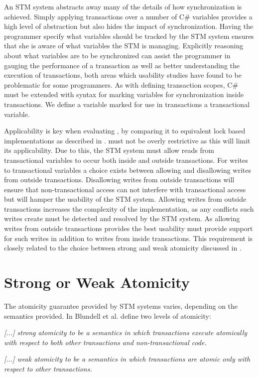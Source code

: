 An \ac{STM} system abstracts away many of the details of how synchronization is achieved. Simply applying transactions over a number of C\# variables provides a high level of abstraction but also hides the impact of synchronization. Having the programmer specify what variables should be tracked by the \ac{STM} system ensures that she is aware of what variables the \ac{STM} is managing. Explicitly reasoning about what variables are to be synchronized can assist the programmer in gauging the performance of a transaction as well as better understanding the execution of transactions, both areas which usability studies\cite{rossbach2010transactional}\cite{pankratius2009does} have found to be problematic for some programmers. As with defining transaction scopes, C\# must be extended with syntax for marking variables for synchronization inside transactions. We define a variable marked for use in transactions a transactional variable.

Applicability is key when evaluating \stmnamesp, by comparing it to equivalent lock based implementations as described in . \stmnamesp must not be overly restrictive as this will limit its applicability. Due to this, the \ac{STM} system must allow reads from transactional variables to occur both inside and outside transactions. For writes to transactional variables a choice exists between allowing and disallowing writes from outside transactions. Disallowing writes from outside transactions will ensure that non-transactional access can not interfere with transactional access but will hamper the usability of the \ac{STM} system. Allowing writes from outside transactions increases the complexity of the implementation, as any conflicts such writes create must be detected and resolved by the \ac{STM} system. As allowing writes from outside transactions provides the best usability \stmnamesp must provide support for such writes in addition to writes from inside transactions. This requirement is closely related to the choice between strong and weak atomicity discussed in .




\section{Strong or Weak Atomicity}
\label{sec:design_strong_weak_atomicity}
The atomicity guarantee provided by \ac{STM} systems varies, depending on the semantics provided. In \cite{blundell2006subtleties} Blundell et al. define two levels of atomicity:
%
\begin{defn}\label{def:strong_atomicity}
\emph{[...] strong atomicity to be a semantics in which transactions execute atomically
with respect to both other transactions and non-transactional code.}
\end{defn}
%
\begin{defn}\label{def:weak_atomicity}
\emph{[...] weak atomicity to be a semantics in which transactions are atomic only with respect to other transactions.}
\end{defn}

